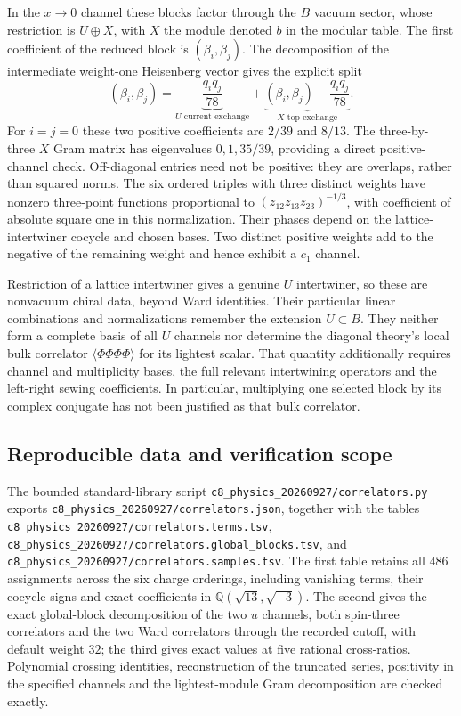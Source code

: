 \documentclass[11pt,a4paper]{article}
\theoremstyle{definition}
\newcommand{\artifact}[1]{\textnormal{\nolinkurl{#1}}}
\begin{document}
In the $x\to0$ channel these blocks factor through the $B$ vacuum
sector, whose restriction is $U\oplus X$, with $X$ the module denoted
$b$ in the modular table.  The first coefficient of the reduced block
is $(\beta_i,\beta_j)$.  The decomposition of the intermediate
weight-one Heisenberg vector gives the explicit split
\begin{equation}
 (\beta_i,\beta_j)
 =\underbrace{\frac{q_iq_j}{78}}_{U\text{ current exchange}}
 +\underbrace{\left(\beta_i,\beta_j\right)
                    -\frac{q_iq_j}{78}}_{X\text{ top exchange}}.
\end{equation}
For $i=j=0$ these two positive coefficients are $2/39$ and $8/13$.
The three-by-three $X$ Gram matrix has eigenvalues $0,1,35/39$,
providing a direct positive-channel check.  Off-diagonal entries need
not be positive: they are overlaps, rather than squared norms.
The six ordered triples with three distinct weights have nonzero
three-point functions proportional to
$(z_{12}z_{13}z_{23})^{-1/3}$, with coefficient of absolute square one
in this normalization.  Their phases depend on the lattice-intertwiner
cocycle and chosen bases.  Two distinct positive weights add to the
negative of the remaining weight and hence exhibit a $c_1$ channel.

Restriction of a lattice intertwiner gives a genuine $U$ intertwiner,
so these are nonvacuum chiral data, beyond Ward identities.  Their
particular linear combinations and normalizations remember the
extension $U\subset B$.  They neither form a complete basis of all
$U$ channels nor determine the diagonal theory's local bulk correlator
$\langle\Phi\Phi\Phi\Phi\rangle$ for its lightest scalar.
That quantity additionally requires channel and multiplicity bases,
the full relevant intertwining operators and the left-right sewing
coefficients.  In particular, multiplying one selected block by its
complex conjugate has not been justified as that bulk correlator.

\subsection{Reproducible data and verification scope}

The bounded standard-library script
\artifact{c8_physics_20260927/correlators.py} exports
\artifact{c8_physics_20260927/correlators.json}, together with the
tables \artifact{c8_physics_20260927/correlators.terms.tsv},
\artifact{c8_physics_20260927/correlators.global_blocks.tsv}, and
\artifact{c8_physics_20260927/correlators.samples.tsv}.
The first table retains all $486$ assignments across the six charge
orderings, including vanishing terms, their cocycle signs and exact
coefficients in $\mathbb Q(\sqrt{13},\sqrt{-3})$.
The second gives the exact global-block decomposition of the two
$u$ channels, both spin-three correlators and the two Ward correlators through the recorded
cutoff, with default weight $32$; the third gives exact values at five
rational cross-ratios.  Polynomial crossing identities, reconstruction
of the truncated series, positivity in the specified channels and the
lightest-module Gram decomposition are checked exactly.
\end{document}
